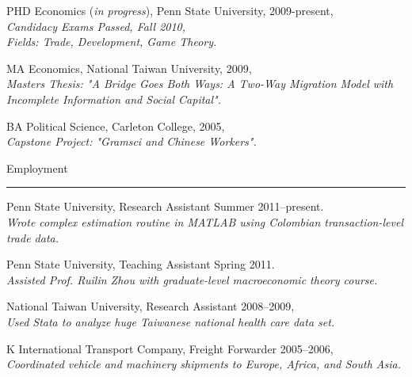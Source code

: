 \documentclass[letterpaper]{article}
\renewenvironment{itemize}{
  \begin{list}{}{
    \setlength{\leftmargin}{1.5em}
  }
}{
  \end{list}
}
\begin{document}
\begin{itemize}
  \item PHD Economics (\emph{in progress}), Penn State University, 2009-present,\\
	\hspace*{1cm}\emph{Candidacy Exams Passed, Fall 2010,}\\
	\hspace*{1cm}\emph{Fields: Trade, Development, Game Theory.}
	

  \item MA Economics, National Taiwan University, 2009,\\
	\hspace*{1cm}\emph{Masters Thesis: "A Bridge Goes Both Ways: A Two-Way Migration Model with Incomplete Information \hspace*{1cm}and Social Capital".}

  \item BA Political Science, Carleton College, 2005,\\
	\hspace*{1cm}\emph{Capstone Project: "Gramsci and Chinese Workers".}
\end{itemize}

\vspace{4mm}
{\Large Employment}
 \hrule

\begin{itemize}
\item Penn State University, Research Assistant Summer 2011--present.\\
      \hspace*{1cm}\emph{Wrote complex estimation routine in MATLAB using Colombian transaction-level trade data.}
\item Penn State University, Teaching Assistant Spring 2011.\\
      \hspace*{1cm}\emph{Assisted Prof. Ruilin Zhou with graduate-level macroeconomic theory course.}
\item National Taiwan University, Research Assistant 2008--2009,\\
	\hspace*{1cm}\emph{Used Stata to analyze huge Taiwanese national health care data set.}
\item K International Transport Company, Freight Forwarder 2005--2006,\\
	\hspace*{1cm}\emph{Coordinated vehicle and machinery shipments to Europe, Africa, and South Asia.} 
\end{itemize}
\end{document}
